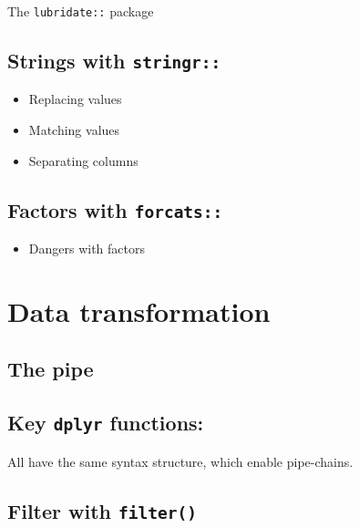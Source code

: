 \documentclass[]{book}
\providecommand{\tightlist}{%
  \setlength{\itemsep}{0pt}\setlength{\parskip}{0pt}}
\begin{document}
The \texttt{lubridate::} package

\hypertarget{strings-with-stringr}{%
\section{\texorpdfstring{Strings with \texttt{stringr::}}{Strings with stringr::}}\label{strings-with-stringr}}

\begin{itemize}
\tightlist
\item
  Replacing values
\item
  Matching values
\item
  Separating columns
\end{itemize}

\hypertarget{factors-with-forcats}{%
\section{\texorpdfstring{Factors with \texttt{forcats::}}{Factors with forcats::}}\label{factors-with-forcats}}

\begin{itemize}
\tightlist
\item
  Dangers with factors
\end{itemize}

\hypertarget{data-transformation}{%
\chapter{Data transformation}\label{data-transformation}}

\hypertarget{the-pipe}{%
\section{The pipe}\label{the-pipe}}

\hypertarget{key-dplyr-functions}{%
\section{\texorpdfstring{Key \texttt{dplyr} functions:}{Key dplyr functions:}}\label{key-dplyr-functions}}

All have the same syntax structure, which enable pipe-chains.

\hypertarget{filter-with-filter}{%
\section{\texorpdfstring{Filter with \texttt{filter()}}{Filter with filter()}}\label{filter-with-filter}}
\end{document}
